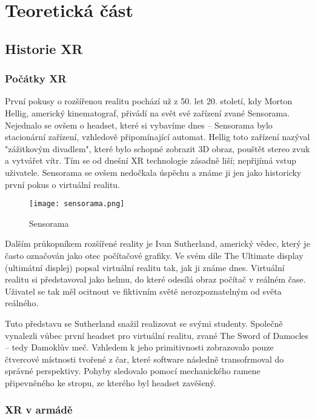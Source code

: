 \part{Teoretická část}

\chapter{Historie XR}

\section{Počátky XR}

První pokusy o rozšířenou realitu pochází už z 50. let 20. století, kdy Morton Hellig, americký kinematograf, přivádí na svět své zařízení zvané Sensorama. Nejednalo se ovšem o headset, které si vybavíme dnes -- Sensorama bylo stacionární zařízení, vzhledově připomínající automat. Hellig toto zařízení nazýval "zážitkovým divadlem", které bylo schopné zobrazit 3D obraz, pouštět stereo zvuk a vytvářet vítr. Tím se od dnešní XR technologie zásadně liší; nepřijímá vstup uživatele. Sensorama se ovšem nedočkala úspěchu a známe ji jen jako historicky první pokus o virtuální realitu. \cite{otechnice}

\begin{figure}[H]
    \centering
    \texttt{[image: sensorama.png]}
    \caption{Sensorama \cite{sensorama_patent}}
    \label{sensorama_fig}
\end{figure}

Dalším průkopníkem rozšířené reality je Ivan Sutherland, americký vědec, který je často označován jako otec počítačové grafiky. Ve svém díle The Ultimate display (ultimátní displej) popsal virtuální realitu tak, jak ji známe dnes. Virtuální realitu si představoval jako helmu, do které odesílá obraz počítač v reálném čase. Uživatel se tak měl ocitnout ve fiktivním světě nerozpoznatelným od světa reálného. \cite{otechnice} \cite{ivan_sutherland_bio}

Tuto představu se Sutherland snažil realizovat se svými studenty. Společně vynalezli vůbec první headset pro virtuální realitu, zvané The Sword of Damocles -- tedy Damoklův meč. Vzhledem k jeho primitivnosti zobrazovalo pouze čtvercové místnosti tvořené z čar, které software následně transofrmoval do správné perspektivy. Pohyby sledovalo pomocí mechanického ramene připevněného ke stropu, ze kterého byl headset zavěšený. \cite{otechnice} \cite{Rheingold_1992}

\section{XR v armádě}

